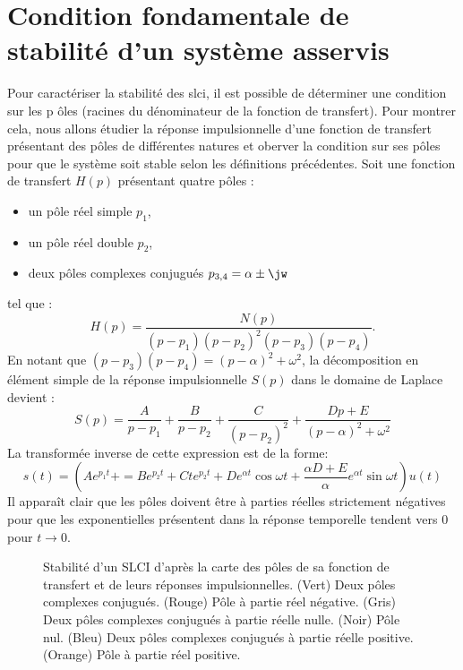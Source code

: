\section[Condition fondamentale de stabilité]
{Condition fondamentale de stabilité d'un système asservis}
Pour caractériser la stabilité des \gls{slci}, il est possible de déterminer
une condition sur les p ôles (racines du dénominateur de la fonction de 
transfert). Pour montrer cela, nous allons étudier la réponse impulsionnelle 
d'une fonction de transfert présentant des pôles de différentes natures et oberver
la condition sur ses pôles pour que le système soit stable selon les définitions
précédentes. 
Soit une fonction de transfert $H(p)$ présentant quatre pôles :
\begin{itemize}
    \item un pôle réel simple $p_1$,
    \item un pôle réel double $p_2$,
    \item deux pôles complexes conjugués $p_{3,4}=\alpha\pm\jw$
\end{itemize}
tel que :
\[
    H(p)=\dfrac{N(p)}{(p-p_1)(p-p_2)^2(p-p_3)(p-p_4)}.
\]
En notant que $(p-p_3)(p-p_4)=(p-\alpha)^2+\omega^2$, 
la décomposition en élément simple de la réponse impulsionnelle $S(p)$ 
dans le domaine de Laplace devient :
\[
    S(p)=\dfrac{A}{p-p_1}+\dfrac{B}{p-p_2}+\dfrac{C}{(p-p_2)^2}+\dfrac{Dp+E}{(p-\alpha)^2+\omega^2}
\]
La transformée inverse de cette expression est de la forme:
\[
    s(t)=\left(Ae^{p_1t}+=Be^{p_2t}+Cte^{p_2t}+De^{\alpha t}\cos{\omega t}+\dfrac{\alpha D+E}{\alpha}e^{\alpha t}\sin{\omega t}\right)u(t)
\]
Il apparaît clair que les pôles doivent être à parties réelles strictement 
négatives pour que les exponentielles présentent dans la réponse temporelle
tendent vers 0 pour $t\to0$.
\clearpage
\thispagestyle{empty}
\begin{landscape}
\centering
\captionsetup{width=1.10\linewidth}
\begin{figure}[!h]
    \centering
    
    \caption{Stabilité d'un SLCI d'après la carte des pôles de sa fonction de
             transfert et de leurs réponses impulsionnelles. 
             (Vert) Deux pôles complexes conjugués. 
             (Rouge) Pôle à partie réel négative. 
             (Gris) Deux pôles complexes conjugués à partie réelle nulle.
             (Noir) Pôle nul.
             (Bleu) Deux pôles complexes conjugués à partie réelle positive.
             (Orange) Pôle à partie réel positive.\label{fig-stab_imp_all}}
\end{figure}
\end{landscape}
